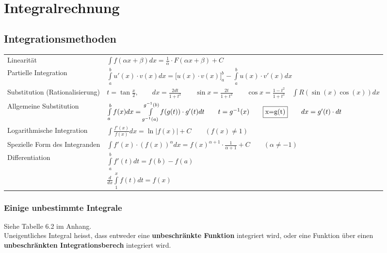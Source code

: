 \section{Integralrechnung }
\subsection{Integrationsmethoden }
  
  \begin{tabular}{ll}
    Linearit\"at & $\int{f(\alpha x+\beta )dx=\frac{1}{\alpha}\cdot F(\alpha x+\beta)+C}$ \\
    Partielle Integration & $\int\limits_a^b{u'(x)\cdot v(x)dx}=\biggl[
    u(x)\cdot v(x) \biggr]_a^b-\int\limits_a^b{u(x)\cdot v'(x)dx}$\\
    Substitution (Rationalisierung) & $t=\tan\frac{x}{2}, \qquad
    dx=\frac{2dt}{1+t^2} \qquad \sin  x=\frac{2t}{1+t^2} \qquad \cos x=\frac{1-t^2}{1+t^2}
    \quad\int{R(\sin(x)\cos(x))dx}$\\
    Allgemeine Substitution &
    $\int\limits_{a}^{b}{f(x)dx}=\int\limits_{g^{-1}(a)}^{g^{-1}(b)}{f(g(t))\cdot
    g'(t)dt}\qquad t=g^{-1}(x)\qquad  \fbox{x=g(t)}\qquad dx=g'(t)\cdot dt$\\
    Logarithmische Integration & $\int{\frac{f'(x)}{f(x)}dx}=\ln|f(x)|+C 
    \qquad{(f(x)\neq 1)}$\\
    Spezielle Form des Integranden & $\int{f'(x)\cdot (f(x))^{\alpha} dx}=
    f(x)^{\alpha +1}\cdot \frac{1}{\alpha+1}+C
    \qquad{(\alpha \neq -1)}$\\
    Differentiation & $\int \limits ^{b} _{a} {f'(t)dt}=f(b)-f(a)$\\
    & $\frac{d}{dx} \int \limits ^{x} _{1} {f(t)dt}=f(x)$
  \end{tabular}
  
  

\subsubsection{Einige unbestimmte Integrale }
Siehe Tabelle 6.2 im Anhang. \\

  Uneigentliches Integral heisst, dass entweder eine \textbf{unbeschr\"ankte
  Funktion} integriert wird, oder eine Funktion \"uber einen
  \textbf{unbeschr\"ankten Integrationsberech} integriert wird.\\


